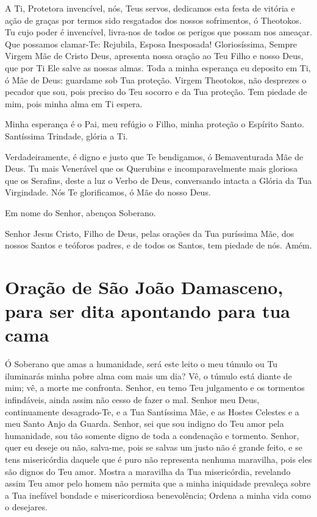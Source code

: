 \documentclass{subfiles}
\begin{document}
A Ti, Protetora invencível, nós, Teus servos, dedicamos esta festa de vitória e
ação de graças por termos sido resgatados dos nossos sofrimentos, ó Theotokos.
Tu cujo poder é invencível, livra-nos de todos os perigos que possam nos
ameaçar. Que possamos clamar-Te: Rejubila, Esposa Inesposada! Gloriosíssima,
Sempre Virgem Mãe de Cristo Deus, apresenta nossa oração ao Teu Filho e nosso
Deus, que por Ti Ele salve as nossas almas. Toda a minha esperança eu deposito
em Ti, ó Mãe de Deus: guardame sob Tua proteção. Virgem Theotokos, não desprezes
o pecador que sou, pois preciso do Teu socorro e da Tua proteção. Tem piedade de
mim, pois minha alma em Ti espera.

Minha esperança é o Pai, meu refúgio o Filho, minha proteção o Espírito Santo.
Santíssima Trindade, glória a Ti.

Verdadeiramente, é digno e justo que Te bendigamos, ó Bemaventurada Mãe de Deus.
Tu mais Venerável que os Querubins e incomparavelmente mais gloriosa que os
Serafins, deste a luz o Verbo de Deus, conversando intacta a Glória da Tua
Virgindade. Nós Te glorificamos, ó Mãe do nosso Deus.

\Doxology{}

\mercy{} \thrice{}

Em nome do Senhor, abençoa Soberano.

Senhor Jesus Cristo, Filho de Deus, pelas orações da Tua puríssima Mãe, dos
nossos Santos e teóforos padres, e de todos os Santos, tem piedade de nós. Amém.


\section*{Oração de São João Damasceno, para ser dita apontando para tua cama}

Ó Soberano que amas a humanidade, será este leito o meu túmulo ou
Tu iluminarás minha pobre alma com mais um dia? Vê, o túmulo está diante
de mim; vê, a morte me confronta. Senhor, eu temo Teu julgamento e os
tormentos infindáveis, ainda assim não cesso de fazer o mal. Senhor meu Deus,
continuamente desagrado-Te, e a Tua Santíssima Mãe, e as Hostes Celestes e
a meu Santo Anjo da Guarda. Senhor, sei que sou indigno do Teu amor pela
humanidade, sou tão somente digno de toda a condenação e tormento.
Senhor, quer eu deseje ou não, salva-me, pois se salvas um justo não é grande
feito, e se tens misericórdia daquele que é puro não representa nenhuma
maravilha, pois eles são dignos do Teu amor. Mostra a maravilha da Tua
misericórdia, revelando assim Teu amor pelo homem não permita que a minha
iniquidade prevaleça sobre a Tua inefável bondade e misericordiosa
benevolência; Ordena a minha vida como o desejares.
\end{document}
